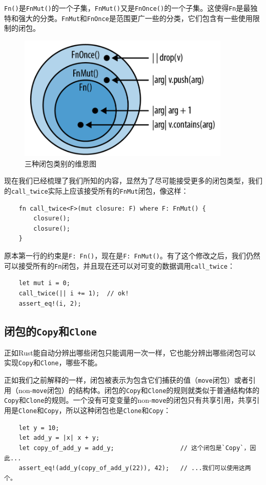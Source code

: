 \texttt{Fn()}是\texttt{FnMut()}的一个子集，\texttt{FnMut()}又是\texttt{FnOnce()}的一个子集。这使得\texttt{Fn}是最独特和强大的分类。\texttt{FnMut}和\texttt{FnOnce}是范围更广一些的分类，它们包含有一些使用限制的闭包。

\begin{figure}[htbp]
    \centering
    \includegraphics[width=0.9\textwidth]{../img/f14-2.png}
    \caption{三种闭包类别的维恩图}
    \label{f14-2}
\end{figure}

现在我们已经梳理了我们所知的内容，显然为了尽可能接受更多的闭包类型，我们的\texttt{call\_twice}实际上应该接受所有的\texttt{FnMut}闭包，像这样：
\begin{verbatim}
    fn call_twice<F>(mut closure: F) where F: FnMut() {
        closure();
        closure();
    }
\end{verbatim}

原本第一行的约束是\texttt{F: Fn()}，现在是\texttt{F: FnMut()}。有了这个修改之后，我们仍然可以接受所有的\texttt{Fn}闭包，并且现在还可以对可变的数据调用\texttt{call\_twice}：
\begin{verbatim}
    let mut i = 0;
    call_twice(|| i += 1);  // ok!
    assert_eq!(i, 2);
\end{verbatim}

\subsection{闭包的\texttt{Copy}和\texttt{Clone}}
正如Rust能自动分辨出哪些闭包只能调用一次一样，它也能分辨出哪些闭包可以实现\texttt{Copy}和\texttt{Clone}，哪些不能。

正如我们之前解释的一样，闭包被表示为包含它们捕获的值（\texttt{move}闭包）或者引用（non-\texttt{move}闭包）的结构体。闭包的\texttt{Copy}和\texttt{Clone}的规则就类似于普通结构体的\texttt{Copy}和\texttt{Clone}的规则。一个没有可变变量的non-\texttt{move}的闭包只有共享引用，共享引用是\texttt{Clone}和\texttt{Copy}，所以这种闭包也是\texttt{Clone}和\texttt{Copy}：
\begin{verbatim}
    let y = 10;
    let add_y = |x| x + y;
    let copy_of_add_y = add_y;                  // 这个闭包是`Copy`，因此...
    assert_eq!(add_y(copy_of_add_y(22)), 42);   // ...我们可以使用这两个。
\end{verbatim}

